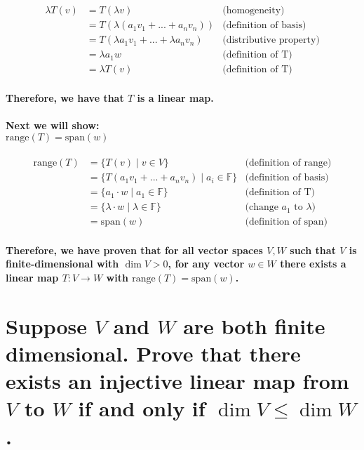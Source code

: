\documentclass{article}
\begin{document}
\begin{align*}
    \lambda T(v) &= T(\lambda v) & \text{(homogeneity)}\\
    &= T(\lambda (a_1v_1+...+a_nv_n)) & \text{(definition of basis)}\\
    &= T(\lambda a_1v_1+...+\lambda a_nv_n) & \text{(distributive property)}\\
    &= \lambda a_1w & \text{(definition of T)}\\
    &= \lambda T(v) & \text{(definition of T)}
\end{align*}

\paragraph{\large
Therefore, we have that $T$ is a linear map.}

\paragraph{\large
Next we will show:
\\$\mathrm{range}(T) = \mathrm{span}(w)$}

\begin{align*}
    \mathrm{range}(T) &= \{T(v)\;|\;v \in V\} & \text{(definition of range)}\\
    &= \{T(a_1v_1+...+a_nv_n)\;|\;a_i \in \mathbb{F}\} & \text{(definition of basis)}\\
    &= \{a_1 \cdot w\;|\;a_1 \in \mathbb{F}\} & \text{(definition of T)}\\
    &= \{\lambda \cdot w\;|\;\lambda \in \mathbb{F}\} & \text{(change $a_1$ to $\lambda$)}\\
    &= \mathrm{span}(w) & \text{(definition of span)}
\end{align*}

\paragraph{\large
Therefore, we have proven that for all vector spaces $V, W$ such that $V$ is finite-dimensional with $\dim V > 0$, for any vector $w \in W$ there exists a linear map $T: V \rightarrow W$ with $\mathrm{range}(T) = \mathrm{span}(w)$.}

\newpage

\section{Suppose $V$ and $W$ are both finite dimensional. Prove that there exists an injective linear map from $V$ to $W$ if and only if $\dim V \leq \dim W$.}
\end{document}

